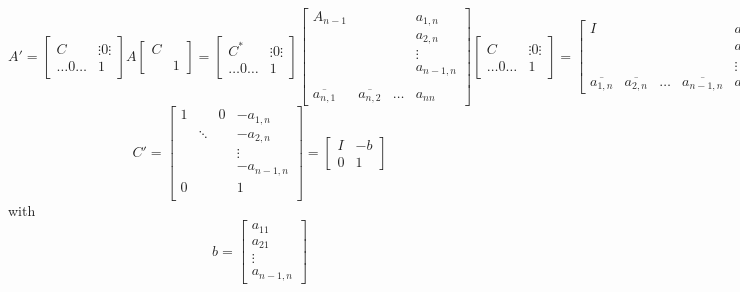 \documentclass{article}
\begin{document}
\[
  A' = \begin{bmatrix}
    C & \vdots 0 \vdots \\
    \ldots 0 \ldots & 1
  \end{bmatrix}
  A
  \begin{bmatrix}
    C & \\
    & 1
  \end{bmatrix}
  = \begin{bmatrix}
    C^* & \vdots 0 \vdots \\
    \ldots 0 \ldots & 1
  \end{bmatrix} \begin{bmatrix}
    A_{n-1} & & & a_{1, n} \\
            & & & a_{2, n} \\
            & & & \vdots \\
            & & & a_{n-1,n} \\ \\
    \overline{a_{n,1}} & \overline{a_{n,2}} & \ldots & a_{nn}
  \end{bmatrix} \begin{bmatrix}
    C & \vdots 0 \vdots \\
    \ldots 0 \ldots & 1
  \end{bmatrix}
  = \begin{bmatrix}
    I & & & & a_{1,n} \\
      & & & & a_{2,n} \\
      & & & & \vdots \\
    \overline{a_{1,n}} & \overline{a_{2,n}} & \ldots & \overline{a_{n-1,n}} & a_{n,n}
  \end{bmatrix}
\] \[
  C' = \begin{bmatrix}
    1 &  & 0 & -a_{1,n} \\
      & \ddots &  & -a_{2,n} \\
      &        &  & \vdots \\
      &        &  & -a_{n-1,n} \\
    0 &        &  & 1 \\
  \end{bmatrix}
  = \left[
    \begin{array}{c|c}
      I & -b \\
      \hline
      0 & 1
    \end{array}
  \right]
\]
with
\[
  b = \begin{bmatrix} a_{11} \\ a_{21} \\ \vdots \\ a_{n-1,n} \end{bmatrix}
\]
\end{document}
